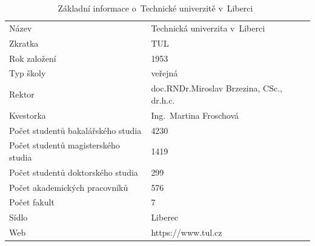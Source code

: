 \documentclass[a4paper,12pt,fonts,nocapnumbers,listingsleft]{./tulpackage/tularticle}
\begin{document}
\vspace{-0.6em}
\begin{table}[H]
    \small
    \begin{tabular}{ll}
        \midrule
        Název                               & Technická univerzita v~Liberci                                      \\
        Zkratka                             & TUL                                                                 \\
        Rok založení                        & 1953                                                                \\
        Typ školy                           & veřejná                                                             \\
        Rektor                              & doc.\thinspace{}RNDr.\thinspace{}Miroslav Brzezina, CSc., dr.\thinspace{}h.\thinspace{}c. \\
        Kvestorka                           & Ing.~Martina Froschová                                                                    \\
        Počet studentů bakalářského studia  & 4230                                                                \\
        Počet studentů magisterského studia & 1419                                                                \\
        Počet studentů doktorského studia   & 299                                                                 \\
        Počet akademických pracovníků       & 576                                                                 \\
        Počet fakult                        & 7                                                                   \\
        Sídlo                               & Liberec                                                             \\
        Web                                 & https://www.tul.cz                                                  \\
        \bottomrule
    \end{tabular}
    \caption{Základní informace o~Technické univerzitě v~Liberci~\cite{vyrocnizprava}}\label{tab:zakladni_informace}
\end{table}
\vspace{0.8em}
\end{document}
